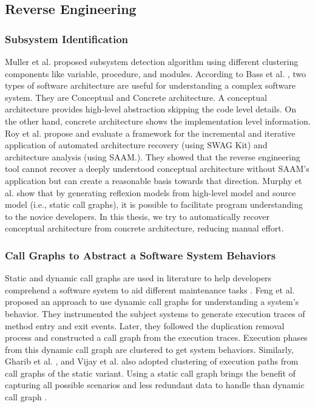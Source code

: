 \subsection{Reverse Engineering}
\label{related:reverse_engineering}
\subsubsection{Subsystem Identification}
Muller et al. \cite{muller1990composingSubsystemStructures} proposed subsystem detection algorithm using different clustering components like variable, procedure, and modules. 
According to Bass et al. \cite{bass2003softwareArchitecturePractice}, two types of software architecture are useful for understanding a complex software system. They are Conceptual and Concrete architecture. A conceptual architecture provides high-level abstraction skipping the code level details. On the other hand, concrete architecture shows the implementation level information. Roy et al. \cite{roy2008softwareArchitectureRecovery} propose and evaluate a framework for the incremental and iterative application of automated architecture recovery (using SWAG Kit) and architecture analysis (using SAAM.). They showed that the reverse engineering tool cannot recover a deeply understood conceptual architecture without SAAM's application but can create a reasonable basis towards that direction. Murphy et al.\cite{MurphyNotkin2001} show that by generating reflexion models from high-level model and source model (i.e., static call graphs), it is possible to facilitate program understanding to the novice developers. In this thesis, we try to automatically recover conceptual architecture from concrete architecture, reducing manual effort.

\subsubsection{Call Graphs to Abstract a Software System Behaviors}

Static and dynamic call graphs are used in literature to help developers comprehend a software system to aid different maintenance tasks \cite{feng2018hierarchicalExecutionComprehension, gharibi2018automaticStaticCluster, xin2019identifyingFeaturesExecution}. Feng et al. \cite{feng2018hierarchicalExecutionComprehension} proposed an approach to use dynamic call graphs for understanding a system's behavior. They instrumented the subject systems to generate execution traces of method entry and exit events. Later, they followed the duplication removal process and constructed a call graph from the execution traces. Execution phases from this dynamic call graph are clustered to get system behaviors. Similarly, Gharib et al. \cite{gharibi2018automaticStaticCluster}, and Vijay et al. \cite{walunj2019graphevoEvolutionCall} also adopted clustering of execution paths from call graphs of the static variant. Using a static call graph brings the benefit of capturing all possible scenarios and less redundant data to handle than dynamic call graph \cite{gharibi2018automaticStaticCluster}. 

